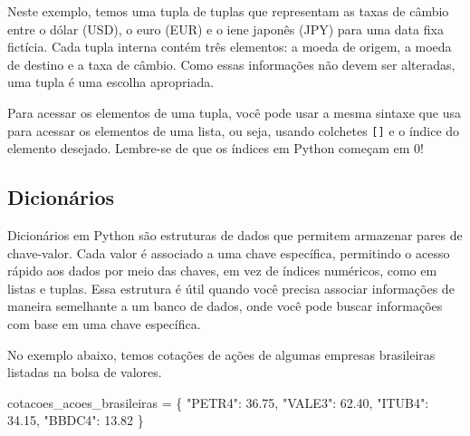 \documentclass[
  portuguese,
  letterpaper,
  DIV=11,
  numbers=noendperiod]{scrreprt}
\newenvironment{Shaded}{\begin{snugshade}}{\end{snugshade}}
\newcommand{\FloatTok}[1]{\textcolor[rgb]{0.68,0.00,0.00}{#1}}
\newcommand{\NormalTok}[1]{\textcolor[rgb]{0.00,0.23,0.31}{#1}}
\newcommand{\OperatorTok}[1]{\textcolor[rgb]{0.37,0.37,0.37}{#1}}
\newcommand{\StringTok}[1]{\textcolor[rgb]{0.13,0.47,0.30}{#1}}
\theoremstyle{definition}
\theoremstyle{remark}
\begin{document}
Neste exemplo, temos uma tupla de tuplas que representam as taxas de
câmbio entre o dólar (USD), o euro (EUR) e o iene japonês (JPY) para uma
data fixa fictícia. Cada tupla interna contém três elementos: a moeda de
origem, a moeda de destino e a taxa de câmbio. Como essas informações
não devem ser alteradas, uma tupla é uma escolha apropriada.

\begin{tcolorbox}[enhanced jigsaw, leftrule=.75mm, opacitybacktitle=0.6, colback=white, coltitle=black, colframe=quarto-callout-tip-color-frame, titlerule=0mm, left=2mm, opacityback=0, breakable, bottomtitle=1mm, toprule=.15mm, title=\textcolor{quarto-callout-tip-color}{\faLightbulb}\hspace{0.5em}{Dica}, colbacktitle=quarto-callout-tip-color!10!white, arc=.35mm, rightrule=.15mm, bottomrule=.15mm, toptitle=1mm]

Para acessar os elementos de uma tupla, você pode usar a mesma sintaxe
que usa para acessar os elementos de uma lista, ou seja, usando
colchetes \texttt{{[}{]}} e o índice do elemento desejado. Lembre-se de
que os índices em Python começam em 0!

\end{tcolorbox}

\subsection{Dicionários}\label{dicionuxe1rios}

Dicionários em Python são estruturas de dados que permitem armazenar
pares de chave-valor. Cada valor é associado a uma chave específica,
permitindo o acesso rápido aos dados por meio das chaves, em vez de
índices numéricos, como em listas e tuplas. Essa estrutura é útil quando
você precisa associar informações de maneira semelhante a um banco de
dados, onde você pode buscar informações com base em uma chave
específica.

No exemplo abaixo, temos cotações de ações de algumas empresas
brasileiras listadas na bolsa de valores.

\begin{Shaded}
\begin{Highlighting}[]
\NormalTok{cotacoes\_acoes\_brasileiras }\OperatorTok{=}\NormalTok{ \{}
    \StringTok{"PETR4"}\NormalTok{: }\FloatTok{36.75}\NormalTok{,}
    \StringTok{"VALE3"}\NormalTok{: }\FloatTok{62.40}\NormalTok{,}
    \StringTok{"ITUB4"}\NormalTok{: }\FloatTok{34.15}\NormalTok{,}
    \StringTok{"BBDC4"}\NormalTok{: }\FloatTok{13.82}
\NormalTok{\}}
\end{Highlighting}
\end{Shaded}
\end{document}
